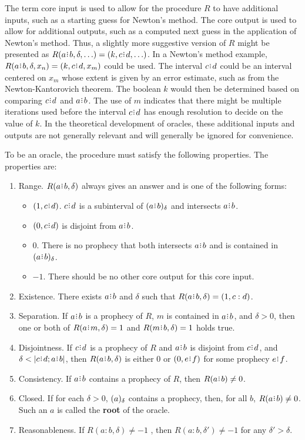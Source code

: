 \documentclass[12pt]{article}
\begin{document}
The term core input is used to allow for the procedure $R$ to have additional inputs, such as a starting guess for Newton's method. The core output is used to allow for additional outputs, such as a computed next guess in the application of Newton's method. Thus, a slightly more suggestive version of $R$ might be presented as $R(a \rint b, \delta, \ldots) = (k, c \rint d, \ldots)$. In a Newton's method example, $R(a \rint b, \delta, x_n) = (k, c \rint d, x_m)$ could be used. The interval $c \rint d$ could be an interval centered on $x_m$ whose extent is given by an error estimate, such as from the Newton-Kantorovich theorem. The boolean $k$ would then be determined based on comparing $c \rint d$ and $a \rint b$. The use of $m$ indicates that there might be multiple iterations used before the interval $c \rint d$ has enough resolution to decide on the value of $k$. In the theoretical development of oracles, these additional inputs and outputs are not generally relevant and will generally be ignored for convenience.  

To be an oracle, the procedure must satisfy the following properties.  The properties are:
\begin{enumerate}
    \item Range. $R(a\rint b, \delta)$  always gives an answer and is one of the following forms: 
    \begin{itemize}
        \item $(1, c\rint d)$. $c\rint d$ is a subinterval of $\halo{a\rint b}$ and intersects $a\rint b$. 
        \item $(0, c\rint d)$ is disjoint from $a\rint b$.
        \item $0$. There is no prophecy that both intersects $a \rint b$ and is contained in $\halo{a \rint b}$.
        \item $-1$. There should be no other core output for this core input. 
    \end{itemize} 
    \item Existence. There exists $a \rint b$ and $\delta$ such that $R(a \rint b, \delta) = (1, c:d)$. 
    \item Separation. If $a\rint b$ is a prophecy of $R$, $m$ is contained in $a\rint b$, and $\delta > 0$, then one or both of $R(a \rint m, \delta) =1$  and $R(m \rint b, \delta) = 1$ holds true. 
   \item Disjointness. 
   If $c\rint d$ is a prophecy of $R$ and $a\rint b$ is disjoint from $c\rint d$, and $\delta < |c \rint d; a\rint b|$, then $R(a\rint b, \delta)$ is either $0$ or $(0, e \rint f)$ for some prophecy $e \rint f$.
    \item Consistency. If $a\rint b$ contains a prophecy of $R$, then $R(a\rint b) \neq 0$. 
    \item Closed. 
    If for each $\delta >0$, $(a)_{\delta}$ contains a prophecy, then, for all $b$, $R(a\rint b) \neq 0$. Such an $a$ is called the \textbf{root} of the oracle. 
    \item Reasonableness. If $R(a:b, \delta) \neq -1$ , then $R(a:b, \delta') \neq -1$ for any $\delta' > \delta$.
\end{enumerate}
\end{document}
